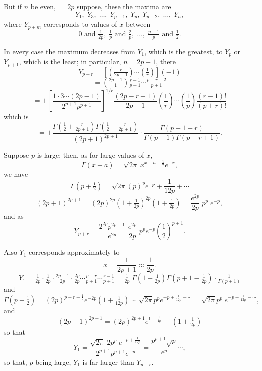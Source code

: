 \documentclass[11pt,a4paper]{article}
\theoremstyle{plain}
\theoremstyle{definition}
\begin{document}
But if $n$ be even, $= 2p$ suppose, these the maxima are
\[
Y_1, \;Y_3, \;\ldots, \;Y_{p-1}, \;Y_p, \;Y_{p+2}, \;\ldots, \;Y_n,
\]
where $Y_{p+m}$ corresponds to values of $x$ between
\[
0 \text{ and } \tfrac{1}{2p}, \; \tfrac{1}{p} \text{ and } \tfrac{2}{p}, \; \ldots, \; \tfrac{p-1}{p} \text{ and } \tfrac{1}{2}.
\]

\clearpage

In every case the maximum decreases from $Y_1$, which is the greatest, to $Y_p$ or $Y_{p+1}$,
which is the least; in particular, $n = 2p + 1$, there
\[
Y_{p+r} = \left[\left(\tfrac{r}{2p+1}\right)\cdots(\tfrac{1}{r})\right](-1)
\]
\[
= \left(\tfrac{2p-1}{1}\right)\tfrac{r-1}{p+1}\cdots\tfrac{p-r-2}{p+1}
\]
\[
= \pm\left[\frac{1 \cdot 3 \cdots (2p-1)}{2^{p+1} p^{p+1}}\right]^{1/r}\frac{(2p-r+1)}{2p+1}\left(\frac{1}{r}\right)\cdots\left(\frac{1}{p}\right)\frac{(r-1)!}{(p+r)!}
\]
which is
\[
= \pm\frac{\Gamma\left(\frac{1}{2}+\tfrac{r}{2p+1}\right)\Gamma\left(\frac{1}{2}-\tfrac{r}{2p+1}\right)}{(2p+1)^{2p+1}}\cdot\frac{\Gamma(p+1-r)}{\Gamma(p+1)\Gamma(p+r+1)}.
\]

Suppose $p$ is large; then, as for large values of $x$,
\[
\Gamma(x+a) = \sqrt{2\pi}\;x^{x+a-\frac{1}{2}}e^{-x},
\]
we have
\[
\Gamma\left(p+\tfrac{1}{2}\right) = \sqrt{2\pi}(p)^{p}e^{-p} + \frac{1}{12p}+ \cdots
\]
\[
\left(2p+1\right)^{2p+1} = \left(2p\right)^{2p}\left(1+\tfrac{1}{2p}\right)^{2p}\left(1+\tfrac{1}{2p}\right)
= \frac{e^{2p}}{2p}\;p^{p}\;e^{-p},
\]
and as
\[
Y_{p+r} = \frac{2^{2p}p^{2p-1}}{e^{2p}}\;\frac{e^{2p}}{2p}\;p^{p}e^{-p}\left(\frac{1}{2}\right)^{p+1}.
\]

Also $Y_1$ corresponds approximately to
\[
x = \frac{1}{2p+1}\approx\frac{1}{2p}.
\]
\[
Y_1 = \tfrac{1}{2p}\cdot\tfrac{1}{2p}\cdot\tfrac{2p-1}{2p}\cdot\tfrac{2p}{2p}\cdots\tfrac{p-r}{p+1}\cdots\tfrac{r-1}{p+1}
= \tfrac{1}{2p}\;\Gamma\left(1+\tfrac{1}{2p}\right)\Gamma\left(p+1-\tfrac{1}{2p}\right) \cdot \tfrac{1}{\Gamma(p+1)}
\]
and
\[
\Gamma(p+\tfrac{1}{2}) = (2p)^{p+r-\frac{1}{2}}e^{-2p}\left(1+\tfrac{1}{12p}\right) \sim \sqrt{2\pi}p^p e^{-p+\frac{1}{12p}-\cdots}
= \sqrt{2\pi}p^p\;e^{-p+\frac{1}{12p}-\cdots},
\]
and
\[
(2p+1)^{2p+1} = (2p)^{2p+1}e^{1+\frac{1}{4p}-\cdots}\left(1+\tfrac{1}{2p}\right)
\]
so that
\[
Y_1 = \frac{\sqrt{2\pi}\;2p^p\;e^{-p+\frac{1}{12p}}}{2^{p+1}p^{p+1}e^{-p}} = \frac{p^{p+1}\sqrt{p}}{e^{p}}\cdots,
\]
so that, $p$ being large, $Y_1$ is far larger than $Y_{p+r}$.

\clearpage

\end{document}
